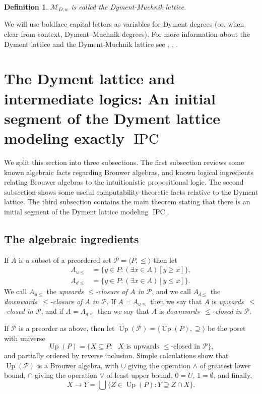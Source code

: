 \documentclass[11pt]{amsart}
\newtheorem{defi}[theorem]{Definition}
\newenvironment{definition}{\begin{defi} \rm}{ \end{defi}}
\DeclareMathOperator{\up}{Up}
\newcommand{\IPC}{\operatorname{IPC}}
\begin{document}
\begin{definition}
$\mathscr{M}_{D,w}$ is called the \emph{Dyment-Muchnik lattice}.
\end{definition}

We will use boldface capital letters as variables for Dyment degrees (or, 
when clear from context, Dyment–Muchnik degrees). For more information about 
the Dyment lattice and the Dyment-Muchnik lattice  see 
\cite{Dyment:Someproperties}, \cite{Sorbi:Someremarks}, \cite{Sorbi-Survey}. 

\section{The Dyment lattice and intermediate logics: 
An initial segment of the Dyment lattice modeling exactly 
$\IPC$}\label{sec:Dyment} 

We split this section into three subsections. The first subsection reviews 
some known algebraic facts regarding Brouwer algebras, and known logical 
ingredients relating Brouwer algebras to the intuitionistic propositional 
logic. The second subsection shows some useful computability-theoretic facts 
relative to the Dyment lattice. The third subsection contains the main 
theorem stating that there is an initial segment of the Dyment lattice 
modeling $\IPC$. 

\subsection{The algebraic ingredients}\label{sct:alg-ingred}
If $A$ is a subset of a preordered set $\mathscr{P}=\langle P, \leq\rangle$ 
then let 
\begin{align*}
A_{u\leq}&= \{y\in P: (\exists x\in A)[y \ge x]\},\\
A_{d\leq}&= \{y\in P: (\exists x \in A)[y \le x]\}.
\end{align*}
We call $A_{u\leq}$ the \emph{upwards $\leq$-closure of $A$ in 
$\mathscr{P}$}, and we call $A_{d\leq}$  the \emph{downwards~$\leq$-closure 
of $A$ in $\mathscr{P}$}. If $A=A_{u\leq}$ then we say that $A$ is 
\emph{upwards~$\le$-closed in $\mathscr{P}$}, and if $A=A_{d\leq}$ then we 
say that $A$ is \emph{downwards~$\le$-closed in $\mathscr{P}$}.  

If $\mathscr{P}$ is a preorder as above, then let $\up(\mathscr{P})=\langle 
\up(P), \supseteq \rangle $ be the poset with universe 
\[
\up(P)=\{X \subseteq P: \textrm{ $X$ is upwards~$\leq$-closed in 
$\mathscr{P}$}\},
\]
and partially ordered by reverse inclusion. Simple calculations show that 
$\up(\mathscr{P})$ is a Brouwer algebra, with $\cup$ giving the operation 
$\wedge$ of greatest lower bound, $\cap$ giving the operation $\lor$ of least 
upper bound, $0=U$, $1= \emptyset$, and finally, 
\begin{equation*}\label{eqn:compute-arrow}
X\rightarrow Y=\bigcup \{Z \in \up(P) : Y \supseteq Z \cap X\}.
\end{equation*} 
\end{document}
